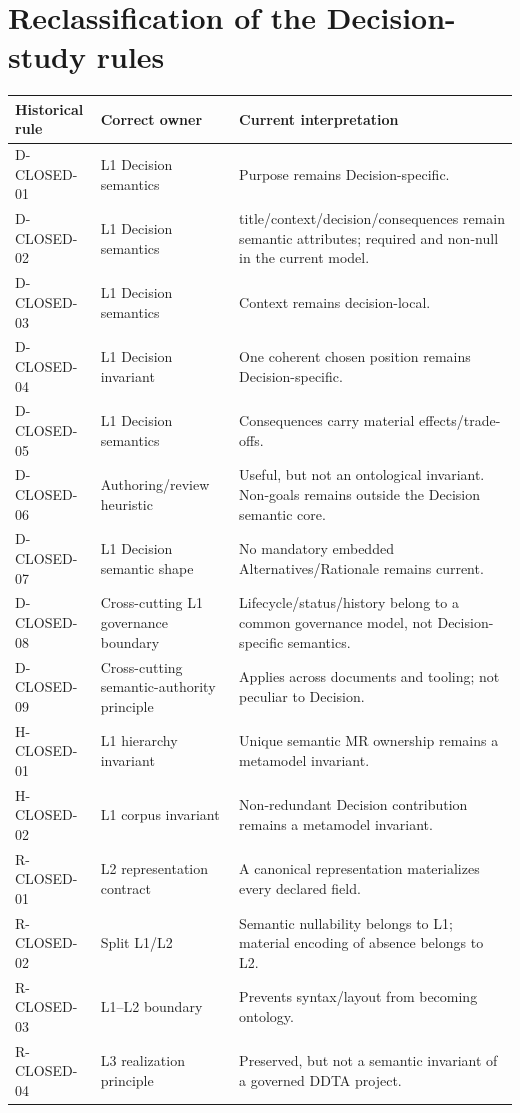 \documentclass[11pt,a4paper]{article}
\begin{document}
\section{Reclassification of the Decision-study rules}
\small
\begin{tabular}{>{\raggedright\arraybackslash}p{2.8cm}>{\raggedright\arraybackslash}p{4.4cm}>{\raggedright\arraybackslash}p{7.0cm}}
\toprule
\textbf{Historical rule} & \textbf{Correct owner} & \textbf{Current interpretation}\\
\midrule
D-CLOSED-01 & L1 Decision semantics & Purpose remains Decision-specific.\\
D-CLOSED-02 & L1 Decision semantics & title/context/decision/consequences remain semantic attributes; required and non-null in the current model.\\
D-CLOSED-03 & L1 Decision semantics & Context remains decision-local.\\
D-CLOSED-04 & L1 Decision invariant & One coherent chosen position remains Decision-specific.\\
D-CLOSED-05 & L1 Decision semantics & Consequences carry material effects/trade-offs.\\
D-CLOSED-06 & Authoring/review heuristic & Useful, but not an ontological invariant. Non-goals remains outside the Decision semantic core.\\
D-CLOSED-07 & L1 Decision semantic shape & No mandatory embedded Alternatives/Rationale remains current.\\
D-CLOSED-08 & Cross-cutting L1 governance boundary & Lifecycle/status/history belong to a common governance model, not Decision-specific semantics.\\
D-CLOSED-09 & Cross-cutting semantic-authority principle & Applies across documents and tooling; not peculiar to Decision.\\
H-CLOSED-01 & L1 hierarchy invariant & Unique semantic MR ownership remains a metamodel invariant.\\
H-CLOSED-02 & L1 corpus invariant & Non-redundant Decision contribution remains a metamodel invariant.\\
R-CLOSED-01 & L2 representation contract & A canonical representation materializes every declared field.\\
R-CLOSED-02 & Split L1/L2 & Semantic nullability belongs to L1; material encoding of absence belongs to L2.\\
R-CLOSED-03 & L1--L2 boundary & Prevents syntax/layout from becoming ontology.\\
R-CLOSED-04 & L3 realization principle & Preserved, but not a semantic invariant of a governed DDTA project.\\
\bottomrule
\end{tabular}
\normalsize
\end{document}
